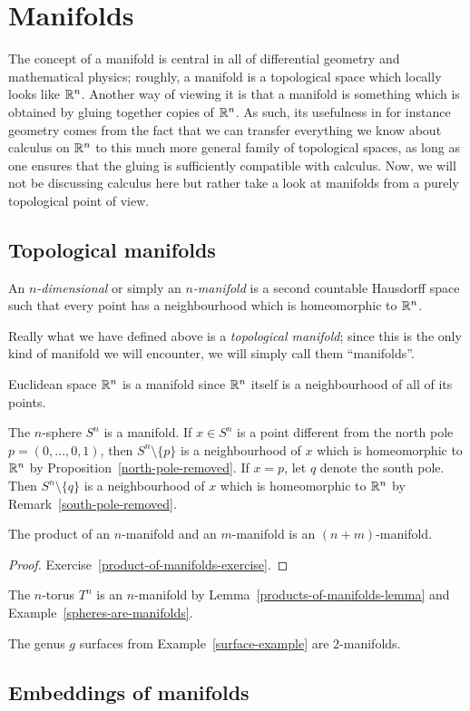 \section{Manifolds}
\label{manifolds}
The concept of a manifold is central in all of differential geometry and mathematical physics; roughly, a manifold is a topological space which locally looks like $\mathbb{R}^n$. Another way of viewing it is that a manifold is something which is obtained by gluing together copies of $\mathbb{R}^n$. As such, its usefulness in for instance geometry comes from the fact that we can transfer everything we know about calculus on $\mathbb{R}^n$ to this much more general family of topological spaces, as long as one ensures that the gluing is sufficiently compatible with calculus. Now, we will not be discussing calculus here but rather take a look at manifolds from a purely topological point of view.

\subsection{Topological manifolds}
\begin{defn}
  An \emph{$n$-dimensional}  or simply an \emph{$n$-manifold} is a second countable Hausdorff space such that every point has a neighbourhood which is homeomorphic to $\mathbb{R}^n$.
\end{defn}
Really what we have defined above is a \emph{topological manifold}; since this is the only kind of manifold we will encounter, we will simply call them ``manifolds''.
\begin{example}
  Euclidean space $\mathbb{R}^n$ is a manifold since $\mathbb{R}^n$ itself is a neighbourhood of all of its points.
\end{example}
\begin{example}
  \label{spheres-are-manifolds}
  The $n$-sphere $S^n$ is a manifold. If $x \in S^n$ is a point different from the north pole $p = (0,\dots,0,1)$, then $S^n \setminus \{p\}$ is a neighbourhood of $x$ which is homeomorphic to $\mathbb{R}^n$ by Proposition~\ref{north-pole-removed}. If $x = p$, let $q$ denote the south pole. Then $S^n \setminus \{q\}$ is a neighbourhood of $x$ which is homeomorphic to $\mathbb{R}^n$ by Remark~\ref{south-pole-removed}.
\end{example}
\begin{lem}
  \label{products-of-manifolds-lemma}
  The product of an $n$-manifold and an $m$-manifold is an $(n+m)$-manifold.
\end{lem}
\begin{proof}
  Exercise~\ref{product-of-manifolds-exercise}.
\end{proof}
\begin{example}
  The $n$-torus $T^n$ is an $n$-manifold by Lemma~\ref{products-of-manifolds-lemma} and Example~\ref{spheres-are-manifolds}.
\end{example}
\begin{example}
  The genus $g$ surfaces from Example~\ref{surface-example} are $2$-manifolds.
\end{example}

\subsection{Embeddings of manifolds}
